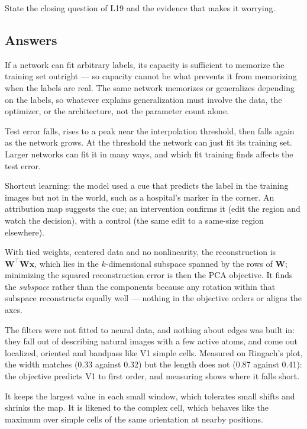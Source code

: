\documentclass[11pt]{article}
\begin{document}
 State the closing question of L19 and the evidence that makes it
worrying.

\subsection*{Answers}

 If a network can fit arbitrary labels, its capacity is sufficient to
memorize the training set outright --- so capacity cannot be what prevents it from
memorizing when the labels are real. The same network memorizes or generalizes
depending on the labels, so whatever explains generalization must involve the
data, the optimizer, or the architecture, not the parameter count alone.

 Test error falls, rises to a peak near the interpolation threshold, then
falls again as the network grows. At the threshold the network can just fit its
training set. Larger networks can fit it in many ways, and which fit training
finds affects the test error.

 Shortcut learning: the model used a cue that predicts the label in the
training images but not in the world, such as a hospital's marker in the corner.
An attribution map suggests the cue; an intervention confirms it (edit the region
and watch the decision), with a control (the same edit to a same-size region
elsewhere).

 With tied weights, centered data and no nonlinearity, the reconstruction
is $\mathbf{W}^\top\mathbf{W}\mathbf{x}$, which lies in the $k$-dimensional
subspace spanned by the rows of $\mathbf{W}$; minimizing the squared
reconstruction error is then the PCA objective. It finds the \emph{subspace}
rather than the components because any rotation within that subspace
reconstructs equally well --- nothing in the objective orders or aligns the axes.

 The filters were not fitted to neural data, and nothing about edges was
built in: they fall out of describing natural images with a few active atoms,
and come out localized, oriented and bandpass like V1 simple cells. Measured on
Ringach's plot, the width matches (0.33 against 0.32) but the length does not
(0.87 against 0.41): the objective predicts V1 to first order, and measuring shows
where it falls short.

 It keeps the largest value in each small window, which tolerates small
shifts and shrinks the map. It is likened to the complex cell, which behaves like
the maximum over simple cells of the same orientation at nearby positions.
\end{document}
